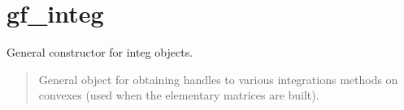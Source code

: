 \documentclass[a4paper,11pt,english]{sphinxmanual}
\begin{document}
\section{gf\_integ}
\label{\detokenize{scilab/cmdref_gf_integ:gf-integ}}\label{\detokenize{scilab/cmdref_gf_integ::doc}}
\sphinxAtStartPar
{}

\begin{sphinxVerbatim}[commandchars=\\\{\}]
   
\end{sphinxVerbatim}

\sphinxAtStartPar
{}

\sphinxAtStartPar
General constructor for integ objects.
\begin{quote}

\sphinxAtStartPar
General object for obtaining handles to various integrations methods on
convexes (used when the elementary matrices are built).
\end{quote}
\end{document}
